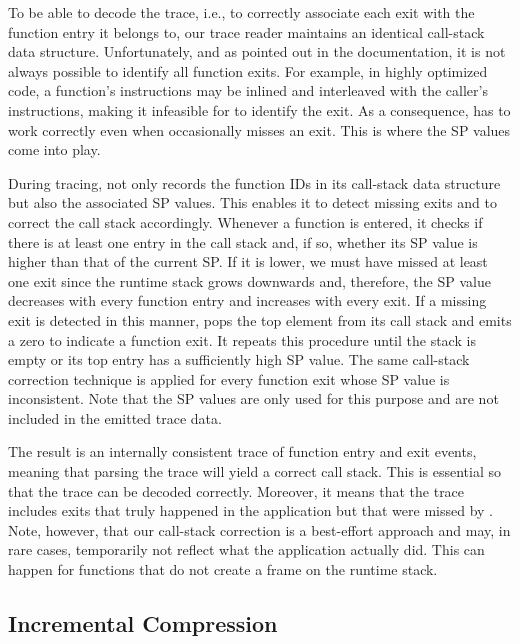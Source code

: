 To be able to decode the trace, i.e., to correctly associate each exit with the function entry it belongs to, our trace reader maintains an identical call-stack data structure. Unfortunately, and as pointed out in the \pin documentation, it is not always possible to identify all function exits. For example, in highly optimized code, a function’s instructions may be inlined and interleaved with the caller’s instructions, making it infeasible for \pin to identify the exit. As a consequence, \parlot has to work correctly even when \pin occasionally misses an exit. This is where the SP values come into play.

During tracing, \parlot not only records the function IDs in its call-stack data structure but also the associated SP values. This enables it to detect missing exits and to correct the call stack accordingly. Whenever a function is entered, it checks if there is at least one entry in the call stack and, if so, whether its SP value is higher than that of the current SP. If it is lower, we must have missed at least one exit since the runtime stack grows downwards and, therefore, the SP value decreases with every function entry and increases with every exit. If a missing exit is detected in this manner, \parlot pops the top element from its call stack and emits a zero to indicate a function exit. It repeats this procedure until the stack is empty or its top entry has a sufficiently high SP value. The same call-stack correction technique is applied for every function exit whose SP value is inconsistent. Note that the SP values are only used for this purpose and are not included in the emitted trace data.

The result is an internally consistent trace of function entry and exit events, meaning that parsing the trace will yield a correct call stack. This is essential so that the trace can be decoded correctly. Moreover, it means that the trace includes exits that truly happened in the application but that were missed by \pin. Note, however, that our call-stack correction is a best-effort approach and may, in rare cases, temporarily not reflect what the application actually did. This can happen for functions that do not create a frame on the runtime stack.

\subsection{Incremental Compression}

